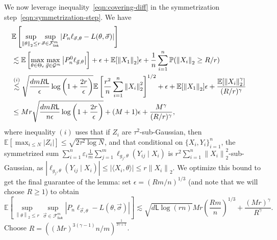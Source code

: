 \documentclass[11pt]{article}
\newcommand{\E}{\mathbb{E}}
\renewcommand{\P}{\mathbb{P}}
\newcommand{\mc}[1]{\mathcal{#1}}
\newcommand{\norm}[1]{\left\|{#1}\right\|} %
\newcommand{\Flink}{\mathcal{F}_{\mathsf{link}}}
\newcommand{\lipconst}{\mathsf{L}}
\newcommand{\loss}{\ell}
\newcommand{\ltwo}[1]{\norm{#1}_2} %
\newcommand{\<}{\langle} %
\renewcommand{\>}{\rangle}
\begin{document}
We now leverage inequality~\eqref{eqn:covering-diff}
in the symmetrization step~\eqref{eqn:symmetrization-step}.
We have
\begin{align*}
	\lefteqn{\E\left[\sup_{\ltwo{\theta} \le r}
		\sup_{\vec{\sigma} \in \Flink^m} |P_n \loss_{\vec{\sigma},\theta} - L(\theta,
		\vec{\sigma})|\right]} \\
	& \lesssim
	\E\left[\max_{\theta \in \Theta_\epsilon}
	\max_{\vec{g} \in \mc{G}^m}
	\left|P_n^0 \loss_{\vec{g}, \theta}\right|
	\right]
	+ \epsilon + \E[\ltwo{X_1}] \epsilon
	+ \frac{1}{n} \sum_{i = 1}^n \P(\ltwo{X_i} \ge R / r) \\
	& \stackrel{(i)}{\lesssim}
	\sqrt{\frac{d m R \lipconst}{\epsilon}
		\log\left(1 + \frac{2r}{\epsilon}\right)}
	\E\left[\frac{r^2}{n}\sum_{i = 1}^n \ltwo{X_i}^2\right]^{1/2}
	+ \epsilon + \E[\ltwo{X_1}] \epsilon
	+ \frac{\E[\ltwo{X_i}^{\gamma}]}{(R/r)^{\gamma}} \\
	& \le
	M r \sqrt{\frac{dm R \lipconst}{n \epsilon}
		\log \left(1 + \frac{2r}{\epsilon}\right)}
	+ (M + 1) \epsilon
	+ \frac{M^{\gamma}}{(R/r)^{\gamma}},
\end{align*}
where inequality $(i)$ uses that if $Z_i$ are $\tau^2$-sub-Gaussian, then
$\E[\max_{i \le N} |Z_i|] \le \sqrt{2 \tau^2 \log N}$, and that
conditional on $\{X_i, Y_i\}_{i = 1}^n$, the symmetrized sum $\sum_{i =
	1}^n \varepsilon_i \frac{1}{m} \sum_{j = 1}^m \loss_{g_j, \theta}(Y_{ij}
\mid X_i)$ is $r^2 \sum_{i = 1}^n \ltwo{X_i}^2$-sub-Gaussian, as
$|\loss_{g_j, \theta}(Y_{ij} \mid X_i)| \le |\<X_i, \theta\>| \le r
\ltwo{X_i}$.  We optimize this bound to get the final guarantee of the
lemma: set $\epsilon = (Rm / n)^{1/3}$ (and note that we will
choose $R \ge 1$) to obtain
\begin{equation*}
	\E\left[\sup_{\ltwo{\theta} \le r}
	\sup_{\vec{\sigma} \in \Flink^m} |P_n \loss_{\vec{\sigma},\theta} - L(\theta,
	\vec{\sigma})|\right]
	\lesssim \sqrt{d \lipconst \log(rn)}
	M r \left(\frac{R m}{n}\right)^{1/3}
	+ \frac{(Mr)^\gamma}{R^\gamma}.
\end{equation*}
Choose $R
= ((Mr)^{3(\gamma - 1)} n / m)^\frac{1}{3\gamma + 1}$.
\end{document}
